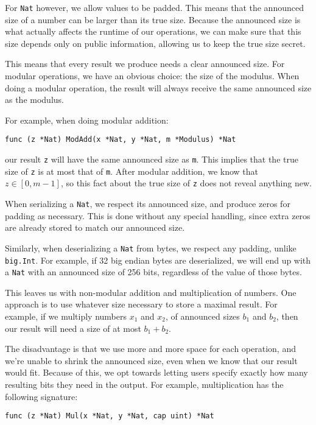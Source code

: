 \documentclass[11pt, a4paper]{article} %
\begin{document}
{For \texttt{Nat} however, we allow values to be padded.
This means that the announced size of a number
can be larger than its true size. Because the announced size
is what actually affects the runtime of our operations,
we can make sure that this size depends only on public information,
allowing us to keep the true size secret.

This means that every result we produce needs a clear
announced size. For modular
operations, we have an obvious choice: the size of the modulus.
When doing a modular operation, the result will always receive
the same announced size as the modulus.

For example, when doing modular addition:

\begin{verbatim}
func (z *Nat) ModAdd(x *Nat, y *Nat, m *Modulus) *Nat
\end{verbatim}

our result \texttt{z} will have the same announced size as \texttt{m}.
This implies that the true size of \texttt{z} is at most that
of \texttt{m}.
After modular addition, we know that $z \in [0, m - 1]$,
so this fact about the true size of \texttt{z} does
not reveal anything new.

When serializing a \texttt{Nat}, we respect its announced size,
and produce zeros for padding as necessary. This is done without
any special handling, since extra zeros are already stored
to match our announced size.

Similarly, when deserializing a \texttt{Nat} from bytes,
we respect any padding, unlike \texttt{big.Int}. For example,
if 32 big endian bytes are deserialized, we will end up
with a \texttt{Nat} with an announced size of 256 bits, regardless
of the value of those bytes.

This leaves us with non-modular addition and multiplication of numbers.
One approach is to use whatever size necessary to store
a maximal result.
For example, if we multiply
numbers $x_1$ and $x_2$, of announced sizes $b_1$ and $b_2$, then
our result will need a size of at most $b_1 + b_2$.

The disadvantage is that we use more and more space for each
operation, and we're unable to shrink the announced size,
even when we know that our result would fit.
Because of this, we opt towards letting users specify exactly how many
resulting bits they need in the output. For example,
multiplication has the following signature:

\begin{verbatim}
func (z *Nat) Mul(x *Nat, y *Nat, cap uint) *Nat
\end{verbatim}

}
\end{document}

